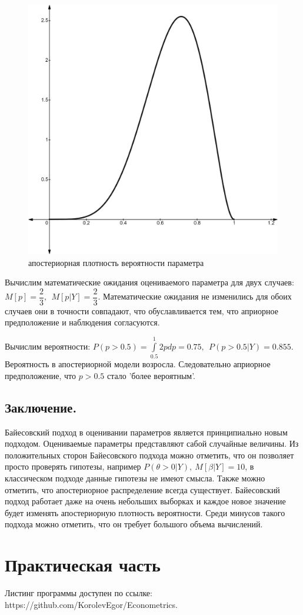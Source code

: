 \documentclass[a4paper,12pt]{article}
\begin{document}
\begin{figure}[H]
    \centering
    \includegraphics[width=0.3\linewidth]{src/img/апостериорное_респределение_2.png}
    \caption{апостериорная плотность вероятности параметра}
\end{figure}

Вычислим математические ожидания оцениваемого параметра для двух случаев: $M[p] = \dfrac{2}{3},~~M[p|Y] = \dfrac{2}{3}$. Математические ожидания не изменились для обоих случаев они в точности совпадают, что обуславливается тем, что априорное предположение и наблюдения согласуются.


Вычислим вероятности: $P(p>0.5) = \int\limits_{0.5}^{1} 2pdp = 0.75,~~P(p>0.5|Y) = 0.855$. Вероятность в апостериорной модели возросла. Следовательно априорное предположение, что $p>0.5$ стало 'более вероятным'.



\subsection*{Заключение.\\}

Байесовский подход в оценивании параметров является принципиально новым подходом. Оцениваемые параметры представляют сабой случайные величины. Из положительных сторон Байесовского подхода можно отметить, что он позволяет просто проверять гипотезы, например $P(\theta > 0|Y),~M[\beta|Y] = 10$, в классическом подходе данные гипотезы не имеют смысла. Также можно отметить, что апостериорное распределение всегда существует. Байесовский подход работает даже на очень небольших выборках и каждое новое значение будет изменять апостериорную плотность вероятности. Среди минусов такого подхода можно отметить, что он требует большого объема вычислений.



\section{Практическая часть}

Листинг программы доступен по ссылке: https://github.com/KorolevEgor/Econometrics.
\end{document}
